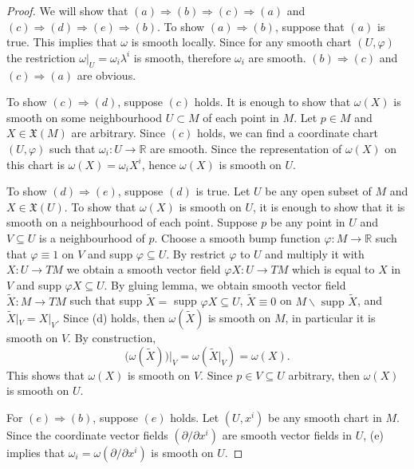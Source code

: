 \documentclass[a4paper]{article}
\theoremstyle{remark}
\newcommand{\er}{\mathbb{R}} %
\newcommand{\doo}{\partial}    %
\newcommand{\subhim}{\subseteq} %
\newcommand{\VF}{\mathfrak{X}} %
\newcommand\wtilde[1]{\widetilde{#1}} %
\begin{document}
\begin{proof}
We will show that $(a) \Rightarrow (b) \Rightarrow (c) \Rightarrow (a)$ and $(c) \Rightarrow (d) \Rightarrow (e) \Rightarrow (b)$. To show $(a) \Rightarrow (b)$, suppose that $(a)$ is true. This implies that $\omega$ is smooth locally. Since for any smooth chart $(U,\varphi)$ the restriction $\omega|_U = \omega_i \lambda^i$ is smooth, therefore $\omega_i$ are smooth. $(b) \Rightarrow (c)$ and $(c) \Rightarrow (a)$ are obvious.

To show $(c) \Rightarrow (d)$, suppose $(c)$ holds. It is enough to show that $\omega(X)$ is smooth on some neighbourhood $U \subset M$ of each point in $M$. Let $p \in M$ and $X \in \VF(M)$ are arbitrary. Since $(c)$ holds, we can find a coordinate chart $(U,\varphi)$ such that $\omega_i : U \to \er$ are smooth. Since the representation of $\omega(X)$ on this chart is $\omega(X) = \omega_iX^i$, hence $\omega(X)$ is smooth on $U$. 

To show $(d) \Rightarrow (e)$, suppose $(d)$ is true. Let $U$ be any open subset of $M$ and $X \in \VF(U)$. To show that $\omega(X)$ is smooth on $U$, it is enough to show that it is smooth on a neighbourhood of each point. Suppose $p$ be any point in $U$ and $V \subhim U$ is a neighbourhood of $p$. Choose a smooth bump function $\varphi : M \to \er$ such that $\varphi \equiv 1$ on $V$ and supp $\varphi \subhim U$. By restrict $\varphi$ to $U$ and multiply it with $X : U \to TM$ we obtain a smooth vector field $\varphi X : U \to TM$ which is equal to $X$ in $V$ and supp $\varphi X \subhim U$. By gluing lemma, we obtain smooth vector field $\wtilde{X} : M \to TM $ such that supp $\wtilde{X}=$ supp $\varphi X \subhim U$, $\wtilde{X} \equiv 0$ on $M \smallsetminus \text{ supp }\wtilde{X}$, and $\wtilde{X}|_V = X|_V$.  Since (d) holds, then $\omega(\wtilde{X})$ is smooth on $M$, in particular it is smooth on $V$. By construction,
$$
\big(\omega(\wtilde{X})\big)|_V = \omega (\wtilde{X}|_V) = \omega(X).
$$
This shows that $\omega(X)$ is smooth on $V$. Since $p \in V \subhim U$ arbitrary, then $\omega(X)$ is smooth on $U$.

For $(e) \Rightarrow (b)$, suppose $(e)$ holds. Let $(U,x^i)$ be any smooth chart in $M$. Since the coordinate vector fields $(\partial / \doo x^i)$ are smooth vector fields in $U$, (e) implies that $\omega_i = \omega(\partial / \doo x^i)$ is smooth on $U$. 
\end{proof}
\end{document}
